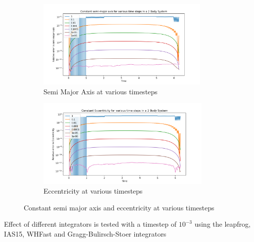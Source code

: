 \documentclass[12pt,a4paper]{article}
\begin{document}
\begin{figure}[H]
  \centering
  \begin{subfigure}{0.49\textwidth}
    \includegraphics[height = 1.7in]{2Body/2Body_const_a_dt.png}
    \caption{Semi Major Axis at various timesteps}
    \label{fig:dt_a}  
  \end{subfigure}
  \begin{subfigure}{0.49\textwidth}
    \includegraphics[height = 1.7in]{2Body/2Body_const_ecc_dt.png}
    \caption{Eccentricity at various timesteps}
    \label{fig:dt_ecc}  
  \end{subfigure}
  \caption{Constant semi major axis and eccentricity at various timesteps}
\end{figure}
Effect of different integrators is tested with a timestep of $10^{-3}$ using the leapfrog, IAS15, WHFast and Gragg-Bulirsch-Stoer integrators\\
\end{document}
